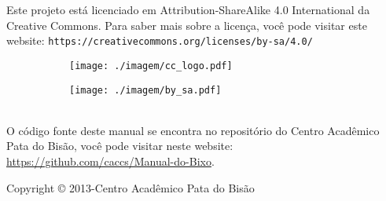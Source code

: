 \begin{center}
  Este projeto está licenciado em Attribution-ShareAlike 4.0 International da Creative Commons. Para saber mais sobre a licença, você pode visitar este website: \texttt{https://creativecommons.org/licenses/by-sa/4.0/}
~\\[\baselineskip]
  \begin{figure}[h]
    \centering
    \begin{subfigure}
      \centering
      \texttt{[image: ./imagem/cc\_logo.pdf]}
    \end{subfigure}
    \begin{subfigure}
      \centering
      \texttt{[image: ./imagem/by\_sa.pdf]}
    \end{subfigure}
  \end{figure}
~\\[\baselineskip]

  O código fonte deste manual se encontra no repositório do Centro Acadêmico Pata do Bisão, você pode visitar neste website: \url{https://github.com/caccs/Manual-do-Bixo}.


  \vfill Copyright © 2013-\the\year \thinspace Centro Acadêmico Pata do Bisão
\end{center}
